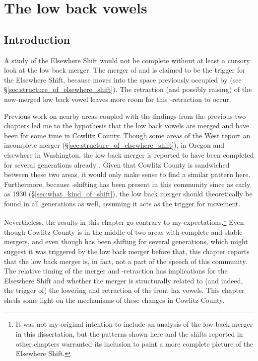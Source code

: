 \chapter{The low back vowels}
\label{ch:low_back}

\section{Introduction}

A study of the Elsewhere Shift would not be complete without at least a cursory look at the low back merger. The merger of \lot and \thought is claimed to be the trigger for the Elsewhere Shift, because \trap moves into the space previously occupied by \lot (see \S\ref{sec:structure_of_elsewhere_shift}). The retraction (and possibly raising) of the now-merged low back vowel leaves more room for this \trap-retraction to occur.

Previous work on nearby areas coupled with the findings from the previous two chapters led me to the hypothesis that the low back vowels are merged and have been for some time in Cowlitz County. Though some areas of the West report an incomplete merger (\S\ref{sec:structure_of_elsewhere_shift}), in Oregon and elsewhere in Washington, the low back merger is reported to have been completed for several generations already \citep{mclarty_etal_2016, wassink_2016_pads}. Given that Cowlitz County is sandwiched between these two areas, it would only make sense to find a similar pattern here. Furthermore, because \bat-shifting has been present in this community since as early as 1930 (\S\ref{sec:what_kind_of_shift}), the low back merger should theoretically be found in all generations as well, assuming it acts as the trigger for \bat movement.

Nevertheless, the results in this chapter go contrary to my expectations.\footnote{It was not my original intention to include an analysis of the low back merger in this dissertation, but the patterns shown here and the shifts reported in other chapters warranted its inclusion to paint a more complete picture of the Elsewhere Shift.} Even though Cowlitz County is in the middle of two areas with complete and stable mergers, and even though \bat has been shifting for several generations, which might suggest it was triggered by the low back merger before that, this chapter reports that the low back merger is, in fact, not a part of the speech of this community. The relative timing of the merger and \bat-retraction has implications for the Elsewhere Shift and whether the merger is structurally related to (and indeed, the trigger of) the lowering and retraction of the front lax vowels. This chapter sheds some light on the mechanisms of these changes in Cowlitz County.


